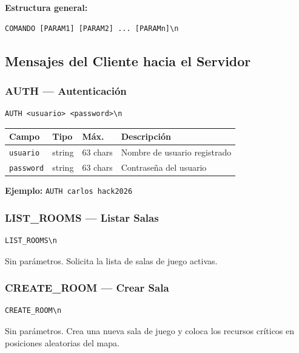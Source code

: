 \documentclass[12pt, letterpaper]{article}
\begin{document}
\textbf{Estructura general:}
\begin{lstlisting}
COMANDO [PARAM1] [PARAM2] ... [PARAMn]\n
\end{lstlisting}

\subsection{Mensajes del Cliente hacia el Servidor}

\subsubsection{AUTH --- Autenticación}

\begin{lstlisting}
AUTH <usuario> <password>\n
\end{lstlisting}

\begin{table}[H]
\centering
\begin{tabularx}{\textwidth}{l l l X}
\toprule
\textbf{Campo} & \textbf{Tipo} & \textbf{Máx.} & \textbf{Descripción} \\
\midrule
\texttt{usuario}  & string & 63 chars & Nombre de usuario registrado \\
\texttt{password} & string & 63 chars & Contraseña del usuario \\
\bottomrule
\end{tabularx}
\end{table}

\textbf{Ejemplo:} \texttt{AUTH carlos hack2026}

\subsubsection{LIST\_ROOMS --- Listar Salas}

\begin{lstlisting}
LIST_ROOMS\n
\end{lstlisting}

Sin parámetros. Solicita la lista de salas de juego activas.

\subsubsection{CREATE\_ROOM --- Crear Sala}

\begin{lstlisting}
CREATE_ROOM\n
\end{lstlisting}

Sin parámetros. Crea una nueva sala de juego y coloca los recursos críticos en posiciones aleatorias del mapa.
\end{document}
